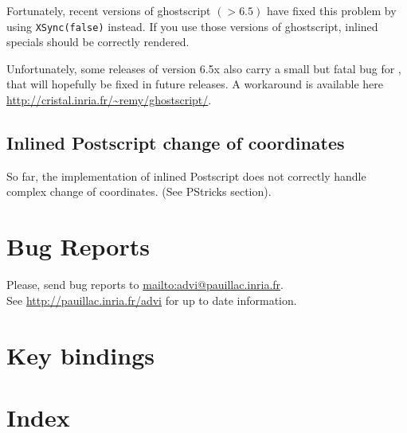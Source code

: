 \documentclass[12pt]{article}
\begin{document}
Fortunately, recent versions of ghostscript $(> 6.5)$ have
fixed this problem by using {\tt XSync(false)} instead.
If you use those versions of ghostscript, inlined specials should be
correctly rendered.

Unfortunately, some releases of version 6.5x also carry a small but
fatal bug for \ActiveDVI, that will hopefully be fixed in future
releases. A workaround is available here
\url{http://cristal.inria.fr/~remy/ghostscript/}.

\subsection*{Inlined Postscript change of coordinates}

So far, the implementation of inlined Postscript does not correctly handle
complex change of coordinates.  (See PStricks section). 

\section {Bug Reports}

Please, send bug reports to 
\url{mailto:advi@pauillac.inria.fr}. 
\\
See \url{http://pauillac.inria.fr/advi} for up to date information.


\section {Key bindings}

\def\key#1{\textcolor{red}{#1}}
\def\ikey#1#2#3{\key{#1} & #2 & -- & #3\\}
\def\arg{\textcolor{blue}{arg }}

\let \Newpage \newpage
\def \newpage {}


\def \newpage{\Newpage}

\section {Index}

\printindex
\end{document}
